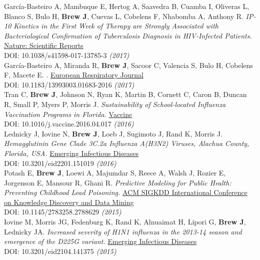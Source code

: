 \documentclass[11pt]{article}
\begin{document}
\noindent García-Basteiro A, Mambuque E, Hertog A, Saavedra B, Cuamba I, Oliveras L, Blanco S, Bulo H, \textbf{Brew J}, Cuevas L, Cobelens F, Nhabomba A, Anthony R. \emph{IP-10 Kinetics in the First Week of Therapy are Strongly Associated with Bacteriological Confirmation of Tuberculosis Diagnosis in HIV-Infected Patients.} \href{https://www.nature.com/articles/s41598-017-13785-3}{Nature: Scientific Reports} \\ DOI: 10.1038/s41598-017-13785-3 \hfill \emph{(2017)} \\

\noindent García-Basteiro A, Miranda R, \textbf{Brew J}, Sacoor C, Valencia S, Bulo H, Cobelens F, Macete E. . \href{http://erj.ersjournals.com}{European Respiratory Journal} \\
DOI: 10.1183/13993003.01683-2016 \hfill \emph{(2017)} \\

\noindent Tran C, \textbf{Brew J}, Johnson N, Ryan K, Martin B, Cornett C, Caron B, Duncan R, Small P, Myers P, Morris J. \emph{Sustainability of School-located Influenza Vaccination Programs in Florida.} \href{http://www.journals.elsevier.com/vaccine}{Vaccine} \\
DOI: 10.1016/j.vaccine.2016.04.017 \hfill \emph{(2016)} \\

\noindent Lednicky J, Iovine N, \textbf{Brew J}, Loeb J, Sugimoto J, Rand K, Morris J. \emph{Hemagglutinin Gene Clade 3C.2a Influenza A(H3N2) Viruses, Alachua County, Florida, USA.} \href{http://wwwnc.cdc.gov/eid/article/22/1/15-1019_article}{Emerging Infectious Diseases} \\
DOI: 10.3201/eid2201.151019 \hfill \emph{(2016)} \\

\noindent Potash E, \textbf{Brew J}, Loewi A, Majumdar S, Reece A, Walsh J, Rozier E, Jorgenson E, Mansour R, Ghani R. \emph{Predictive Modeling for Public Health: Preventing Childhood Lead Poisoning.} \href{http://dl.acm.org/citation.cfm?id=2788629&dl=ACM&coll=DL&CFID=747855435&CFTOKEN=56343631}{ACM SIGKDD International Conference on Knowledge Discovery and Data Mining} \\  
DOI: 10.1145/2783258.2788629 \hfill \emph{(2015)}\\

\noindent Iovine M, Morris JG, Fedenburg K, Rand K, Alnuaimat H, Lipori G, \textbf{Brew J}, Lednicky JA. \emph{Increased severity of H1N1 influenza in the 2013-14 season and emergence of the D225G variant.} \href{http://wwwnc.cdc.gov/eid/article/21/4/14-1375_article}{Emerging Infectious Diseases} \\
DOI: 10.3201/eid2104.141375 \hfill \emph{(2015)}\\
\end{document}
